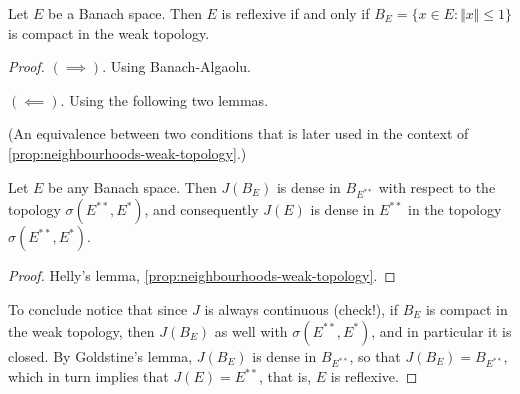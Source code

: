 \documentclass{article}
\theoremstyle{definition}
\numberwithin{equation}{section}
\begin{document}
\begin{thm}[Kakutani]
	Let $E$ be a Banach space. Then $E$ is reflexive if and only if $B_E=\{x\in E:\Vert x\Vert\leq1\}$ is compact in the weak topology.
\end{thm}
\begin{proof}\leavevmode
	
	$(\implies)$. Using Banach-Algaolu.
	
	$(\impliedby)$. Using the following two lemmas.
\begin{lemma}[Helly]
	(An equivalence between two conditions that is later used in the context of \cref{prop:neighbourhoods-weak-topology}.)
\end{lemma}
\begin{lemma}[Goldstine]
	Let $E$ be any Banach space. Then $J(B_E)$ is dense in $B_{E^{**}}$ with respect to the topology $\sigma(E^{**},E^*)$, and consequently $J(E)$ is dense in $E^{**}$ in the topology $\sigma(E^{**},E^*)$.
\end{lemma}
\begin{proof}
	Helly's lemma, \cref{prop:neighbourhoods-weak-topology}.
\end{proof}

To conclude notice that since $J$ is always continuous (check!), if $B_E$ is compact in the weak topology, then $J(B_E)$ as well with $\sigma(E^{**},E^*)$, and in particular it is closed. By Goldstine's lemma, $J(B_E)$ is dense in $B_{E^{**}}$, so that $J(B_E)=B_{E^{**}}$, which in turn implies that $J(E)=E^{**}$, that is, $E$ is reflexive.
\end{proof}
\end{document}

